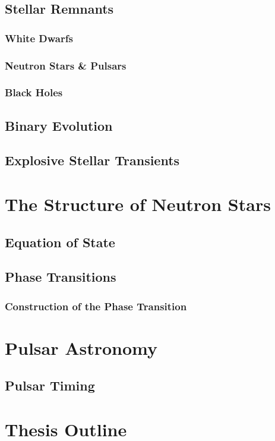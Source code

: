 \documentclass[main.tex]{subfiles}
\begin{document}
    \subsection{Stellar Remnants}

    
    \subsubsection{White Dwarfs}


    \subsubsection{Neutron Stars \& Pulsars}


    \subsubsection{Black Holes}


    \subsection{Binary Evolution}

    \subsection{Explosive Stellar Transients}


    \section{The Structure of Neutron Stars}

    \subsection{Equation of State}
    \subsection{Phase Transitions}
    \subsubsection{Construction of the Phase Transition}

    \section{Pulsar Astronomy}

    \subsection{Pulsar Timing}

    \section{Thesis Outline}
    
\end{document}
